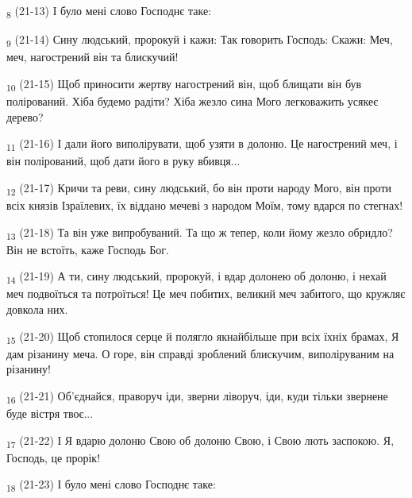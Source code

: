 \begin{tcolorbox}
\textsubscript{8} (21-13) І було мені слово Господнє таке:
\end{tcolorbox}
\begin{tcolorbox}
\textsubscript{9} (21-14) Сину людський, пророкуй і кажи: Так говорить Господь: Скажи: Меч, меч, нагострений він та блискучий!
\end{tcolorbox}
\begin{tcolorbox}
\textsubscript{10} (21-15) Щоб приносити жертву нагострений він, щоб блищати він був полірований. Хіба будемо радіти? Хіба жезло сина Мого легковажить усякеє дерево?
\end{tcolorbox}
\begin{tcolorbox}
\textsubscript{11} (21-16) І дали його виполірувати, щоб узяти в долоню. Це нагострений меч, і він полірований, щоб дати його в руку вбивця...
\end{tcolorbox}
\begin{tcolorbox}
\textsubscript{12} (21-17) Кричи та реви, сину людський, бо він проти народу Мого, він проти всіх князів Ізраїлевих, їх віддано мечеві з народом Моїм, тому вдарся по стегнах!
\end{tcolorbox}
\begin{tcolorbox}
\textsubscript{13} (21-18) Та він уже випробуваний. Та що ж тепер, коли йому жезло обридло? Він не встоїть, каже Господь Бог.
\end{tcolorbox}
\begin{tcolorbox}
\textsubscript{14} (21-19) А ти, сину людський, пророкуй, і вдар долонею об долоню, і нехай меч подвоїться та потроїться! Це меч побитих, великий меч забитого, що кружляє довкола них.
\end{tcolorbox}
\begin{tcolorbox}
\textsubscript{15} (21-20) Щоб стопилося серце й полягло якнайбільше при всіх їхніх брамах, Я дам різанину меча. О горе, він справді зроблений блискучим, виполіруваним на різанину!
\end{tcolorbox}
\begin{tcolorbox}
\textsubscript{16} (21-21) Об'єднайся, праворуч іди, зверни ліворуч, іди, куди тільки звернене буде вістря твоє...
\end{tcolorbox}
\begin{tcolorbox}
\textsubscript{17} (21-22) І Я вдарю долоню Свою об долоню Свою, і Свою лють заспокою. Я, Господь, це прорік!
\end{tcolorbox}
\begin{tcolorbox}
\textsubscript{18} (21-23) І було мені слово Господнє таке:
\end{tcolorbox}

